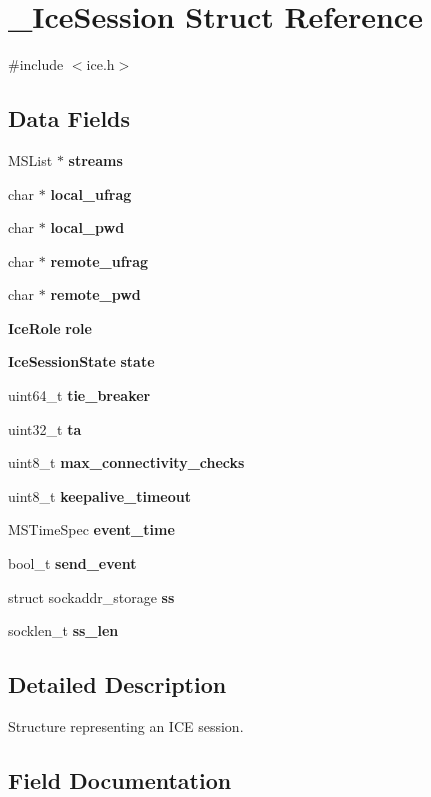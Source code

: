 \section{\-\_\-\-Ice\-Session Struct Reference}
\label{struct__IceSession}


{\ttfamily \#include $<$ice.\-h$>$}

\subsection*{Data Fields}
\begin{DoxyCompactItemize}
\item 
M\-S\-List $\ast$ {\bf streams}
\item 
char $\ast$ {\bf local\-\_\-ufrag}
\item 
char $\ast$ {\bf local\-\_\-pwd}
\item 
char $\ast$ {\bf remote\-\_\-ufrag}
\item 
char $\ast$ {\bf remote\-\_\-pwd}
\item 
{\bf Ice\-Role} {\bf role}
\item 
{\bf Ice\-Session\-State} {\bf state}
\item 
uint64\-\_\-t {\bf tie\-\_\-breaker}
\item 
uint32\-\_\-t {\bf ta}
\item 
uint8\-\_\-t {\bf max\-\_\-connectivity\-\_\-checks}
\item 
uint8\-\_\-t {\bf keepalive\-\_\-timeout}
\item 
M\-S\-Time\-Spec {\bf event\-\_\-time}
\item 
bool\-\_\-t {\bf send\-\_\-event}
\item 
struct sockaddr\-\_\-storage {\bf ss}
\item 
socklen\-\_\-t {\bf ss\-\_\-len}
\end{DoxyCompactItemize}


\subsection{Detailed Description}
Structure representing an I\-C\-E session. 

\subsection{Field Documentation}
